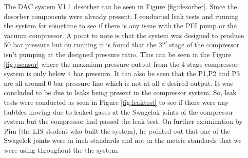 The DAC system V1.1 desorber can be seen in Figure \ref{fig:desorber}. Since the desorber components were already present. I conducted leak tests and running the system for sometime to see if there is any issue with the PEI pump or the vacuum compressor. A point to note is that the system was designed to produce 50 bar pressure but on running it is found that the $3^{rd}$ stage of the compressor isn't pumping at the designed pressure ratio. This can be seen in the Figure \ref{fig:psensor} where the maxmium pressure output from the 4 stage compressor system is only below 4 bar pressure. It can also be seen that the P1,P2 and P3 are all around 0 bar pressure line which is not at all a desired output.
\bigbreak 
It was concluded to be due to leaks being present in the compressor system. So, leak tests were conducted as seen in Figure \ref{fig:leaktest} to see if there were any bubbles moving due to leaked gases at the Swagelok joints of the compressor system but the compressor had passed the leak test. On further examination by Pim (the LIS student who built the system), he pointed out that one of the Swagelok joints were in inch standards and not in the metric standards that we were using throughout the the system. 

